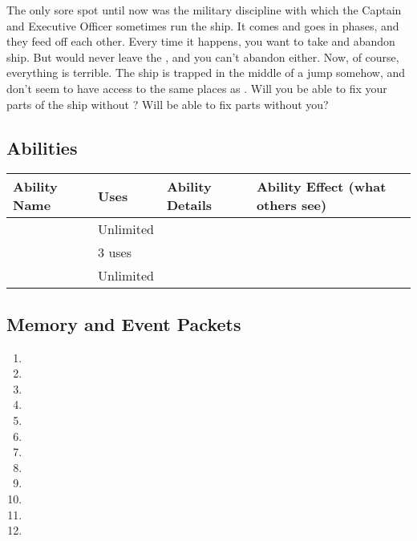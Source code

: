 \documentclass[char]{TMFHope}
\begin{document}
The only sore spot until now was the military discipline with which the Captain and Executive Officer sometimes run the ship. It comes and goes in phases, and they feed off each other. Every time it happens, you want to take \cNav{} and abandon ship. But \cEng{} would never leave the \pNew{}, and you can't abandon \cEng{\them} either. Now, of course, everything is terrible. The ship is trapped in the middle of a jump somehow, and don't seem to have access to the same places as \cEng{}. Will you be able to fix your parts of the ship without \cEng{\them}? Will \cEng{\they} be able to fix \cEng{\their} parts without you?


\subsection*{Abilities}
\begin{tabular}{|p{2cm}|p{1.5cm}|p{9cm}|p{3.5cm}|} 
 \hline
 \textbf{Ability Name} & \textbf{Uses} & \textbf{Ability Details} & \textbf{Ability Effect (what others see)} \\ 
\hline 
 \aEngineering{\MYname} & Unlimited & \aEngineering{\MYtext} & \aEngineering{\MYeffect} \\ 
\hline
 \aNegotiation{\MYname} & 3 uses & \aNegotiation{\MYtext} & \aNegotiation{\MYeffect}\\ 
 \hline
	\aPractice{\MYname} & Unlimited & \aPractice{\MYtext} & \aPractice{\MYeffect} \\ 
\hline
\end{tabular}

\subsection*{Memory and Event Packets}
\begin{enumerate}
	\item \mPractice{\MYname}
	\item \mDHAlpha{\MYname}
	\item \mDeckHandOne{\MYname}
	\item \mRepairsTwo{\MYname}
	\item \mRepairsFour{\MYname}
	\item \mBroom{\MYname}
	\item \mLab{\MYname}
	\item \mPatient{\MYname}
	\item \mKitchen{\MYname}
	\item \mWeight{\MYname}
	\item \mTheater{\MYname}
	\item \mCrates{\MYname}
\end{enumerate}
\end{document}

